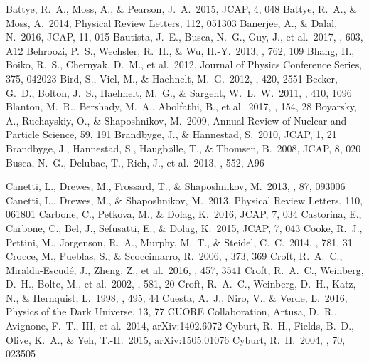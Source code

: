 \documentclass{emulateapj}
\begin{document}
\begin{thebibliography}{}
 Battye, R.~A., Moss, A., \& Pearson, J.~A.\ 2015, JCAP, 4, 048
 Battye, R.~A., \& Moss, A.\ 2014, Physical Review Letters, 112, 051303 
 Banerjee, A., \& Dalal, N.\ 2016, JCAP, 11, 015 
 Bautista, J.~E., Busca, N.~G., Guy, J., et al.\ 2017, \aap, 603, A12
 Behroozi, P.~S., Wechsler, R.~H., \& Wu, H.-Y.\ 2013, \apj, 762, 109 
 Bhang, H., Boiko, R.~S., Chernyak, D.~M., et al.\ 2012, Journal of Physics Conference Series, 375, 042023
 Bird, S., Viel, M., \& Haehnelt, M.~G.\ 2012, \mnras, 420, 2551  
 Becker, G.~D., Bolton, J.~S., Haehnelt, M.~G., \& Sargent, W.~L.~W.\ 2011, \mnras, 410, 1096 
 Blanton, M.~R., Bershady, M.~A., Abolfathi, B., et al.\ 2017, \aj, 154, 28 
 Boyarsky, A., Ruchayskiy, O., \& Shaposhnikov, M.\ 2009, Annual Review of Nuclear and Particle Science, 59, 191
 Brandbyge, J., \& Hannestad, S.\ 2010, JCAP, 1, 21 
 Brandbyge, J., Hannestad, S., Haugb{\o}lle, T., \& Thomsen, B.\ 2008, JCAP, 8, 020
 Busca, N.~G., Delubac, T., Rich, J., et al.\ 2013, \aap, 552, A96



 Canetti, L., Drewes, M., Frossard, T., \& Shaposhnikov, M.\ 2013, \prd, 87, 093006 
 Canetti, L., Drewes, M., \& Shaposhnikov, M.\ 2013, Physical Review Letters, 110, 061801
 Carbone, C., Petkova, M., \& Dolag, K.\ 2016, JCAP, 7, 034 
 Castorina, E., Carbone, C., Bel, J., Sefusatti, E., \& Dolag, K.\ 2015, JCAP, 7, 043 
 Cooke, R.~J., Pettini, M., Jorgenson, R.~A., Murphy, M.~T., \& Steidel, C.~C.\ 2014, \apj, 781, 31 
 Crocce, M., Pueblas, S., \& Scoccimarro, R.\ 2006, \mnras, 373, 369 
 Croft, R.~A.~C., Miralda-Escud{\'e}, J., Zheng, Z., et al.\ 2016, \mnras, 457, 3541 
 Croft, R.~A.~C., Weinberg, D.~H., Bolte, M., et al.\ 2002, \apj, 581, 20 
 Croft, R.~A.~C., Weinberg, D.~H., Katz, N., \& Hernquist, L.\ 1998, \apj, 495, 44 
 Cuesta, A.~J., Niro, V., \& Verde, L.\ 2016, Physics of the Dark Universe, 13, 77 
 CUORE Collaboration, Artusa, D.~R., Avignone, F.~T., III, et al.\ 2014, arXiv:1402.6072 
 Cyburt, R.~H., Fields, B.~D., Olive, K.~A., \& Yeh, T.-H.\ 2015, arXiv:1505.01076 
 Cyburt, R.~H.\ 2004, \prd, 70, 023505 


\end{thebibliography}
\end{document}
